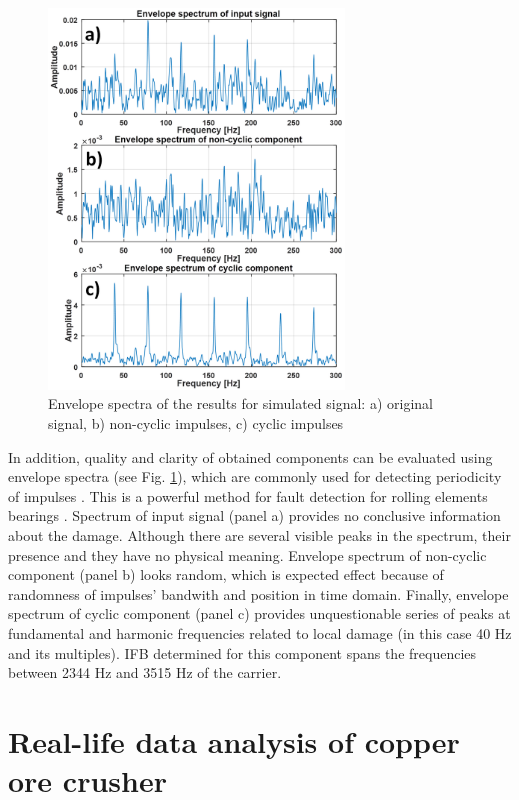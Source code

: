 \documentclass[preprint,12pt]{elsarticle}
\begin{document}
\begin{figure}[!ht]
\centering
\includegraphics[width = 0.7\textwidth]{figs3/output_specs2.png}
\caption{Envelope spectra of the results for simulated signal: a) original signal, b) non-cyclic impulses, c) cyclic impulses}
\label{fig: outspecs}
\end{figure}



In addition, quality and clarity of obtained components can be evaluated using envelope spectra (see Fig. \ref{fig: outspecs}), which are commonly used for detecting periodicity of impulses \cite{randall2011rolling}. This is a powerful method for fault detection for rolling elements bearings \cite{randall2011rolling}. Spectrum of input signal (panel a) provides no conclusive information about the damage. Although there are several visible peaks in the spectrum, their presence and they have no physical meaning. Envelope spectrum of non-cyclic component (panel b) looks random, which is expected effect because of randomness of impulses' bandwith and position in time domain. Finally, envelope spectrum of cyclic component (panel c) provides unquestionable series of peaks at fundamental and harmonic frequencies related to local damage (in this case 40 Hz and its multiples). IFB determined for this component spans the frequencies between 2344 Hz and 3515 Hz of the carrier.



\section{Real-life data analysis of copper ore crusher}
\end{document}
